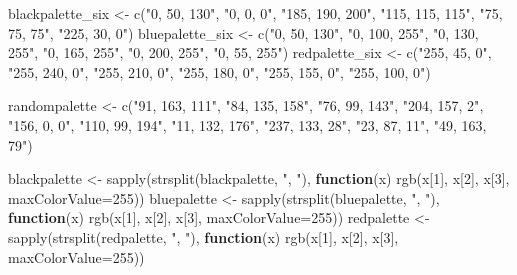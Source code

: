 \documentclass[
]{book}
\newenvironment{Shaded}{\begin{snugshade}}{\end{snugshade}}
\newcommand{\AttributeTok}[1]{\textcolor[rgb]{0.77,0.63,0.00}{#1}}
\newcommand{\ControlFlowTok}[1]{\textcolor[rgb]{0.13,0.29,0.53}{\textbf{#1}}}
\newcommand{\DecValTok}[1]{\textcolor[rgb]{0.00,0.00,0.81}{#1}}
\newcommand{\FunctionTok}[1]{\textcolor[rgb]{0.00,0.00,0.00}{#1}}
\newcommand{\NormalTok}[1]{#1}
\newcommand{\OtherTok}[1]{\textcolor[rgb]{0.56,0.35,0.01}{#1}}
\newcommand{\StringTok}[1]{\textcolor[rgb]{0.31,0.60,0.02}{#1}}
\begin{document}
\begin{Shaded}
\begin{Highlighting}[]
\NormalTok{blackpalette\_six }\OtherTok{\textless{}{-}} \FunctionTok{c}\NormalTok{(}\StringTok{"0, 50, 130"}\NormalTok{,}
                      \StringTok{"0, 0, 0"}\NormalTok{,}
                      \StringTok{"185, 190, 200"}\NormalTok{,}
                      \StringTok{"115, 115, 115"}\NormalTok{,}
                      \StringTok{"75, 75, 75"}\NormalTok{,}
                      \StringTok{"225, 30, 0"}\NormalTok{)}
\NormalTok{bluepalette\_six }\OtherTok{\textless{}{-}} \FunctionTok{c}\NormalTok{(}\StringTok{"0, 50, 130"}\NormalTok{,}
                     \StringTok{"0, 100, 255"}\NormalTok{,}
                     \StringTok{"0, 130, 255"}\NormalTok{,}
                     \StringTok{"0, 165, 255"}\NormalTok{,}
                     \StringTok{"0, 200, 255"}\NormalTok{,}
                     \StringTok{"0, 55, 255"}\NormalTok{)}
\NormalTok{redpalette\_six }\OtherTok{\textless{}{-}} \FunctionTok{c}\NormalTok{(}\StringTok{"255, 45, 0"}\NormalTok{,}
                    \StringTok{"255, 240, 0"}\NormalTok{,}
                    \StringTok{"255, 210, 0"}\NormalTok{,}
                    \StringTok{"255, 180, 0"}\NormalTok{,}
                    \StringTok{"255, 155, 0"}\NormalTok{,}
                    \StringTok{"255, 100, 0"}\NormalTok{)}

\NormalTok{randompalette }\OtherTok{\textless{}{-}} \FunctionTok{c}\NormalTok{(}\StringTok{"91, 163, 111"}\NormalTok{,}
                   \StringTok{"84, 135, 158"}\NormalTok{,}
                   \StringTok{"76, 99, 143"}\NormalTok{,}
                   \StringTok{"204, 157, 2"}\NormalTok{,}
                   \StringTok{"156, 0, 0"}\NormalTok{,}
                   \StringTok{"110, 99, 194"}\NormalTok{,}
                   \StringTok{"11, 132, 176"}\NormalTok{,}
                   \StringTok{"237, 133, 28"}\NormalTok{,}
                   \StringTok{"23, 87, 11"}\NormalTok{,}
                   \StringTok{"49, 163, 79"}\NormalTok{)}

\NormalTok{blackpalette }\OtherTok{\textless{}{-}} \FunctionTok{sapply}\NormalTok{(}\FunctionTok{strsplit}\NormalTok{(blackpalette, }\StringTok{", "}\NormalTok{), }\ControlFlowTok{function}\NormalTok{(x)}
    \FunctionTok{rgb}\NormalTok{(x[}\DecValTok{1}\NormalTok{], x[}\DecValTok{2}\NormalTok{], x[}\DecValTok{3}\NormalTok{], }\AttributeTok{maxColorValue=}\DecValTok{255}\NormalTok{))}
\NormalTok{bluepalette }\OtherTok{\textless{}{-}} \FunctionTok{sapply}\NormalTok{(}\FunctionTok{strsplit}\NormalTok{(bluepalette, }\StringTok{", "}\NormalTok{), }\ControlFlowTok{function}\NormalTok{(x)}
    \FunctionTok{rgb}\NormalTok{(x[}\DecValTok{1}\NormalTok{], x[}\DecValTok{2}\NormalTok{], x[}\DecValTok{3}\NormalTok{], }\AttributeTok{maxColorValue=}\DecValTok{255}\NormalTok{))}
\NormalTok{redpalette }\OtherTok{\textless{}{-}} \FunctionTok{sapply}\NormalTok{(}\FunctionTok{strsplit}\NormalTok{(redpalette, }\StringTok{", "}\NormalTok{), }\ControlFlowTok{function}\NormalTok{(x)}
    \FunctionTok{rgb}\NormalTok{(x[}\DecValTok{1}\NormalTok{], x[}\DecValTok{2}\NormalTok{], x[}\DecValTok{3}\NormalTok{], }\AttributeTok{maxColorValue=}\DecValTok{255}\NormalTok{))}


\end{Highlighting}
\end{Shaded}
\end{document}
